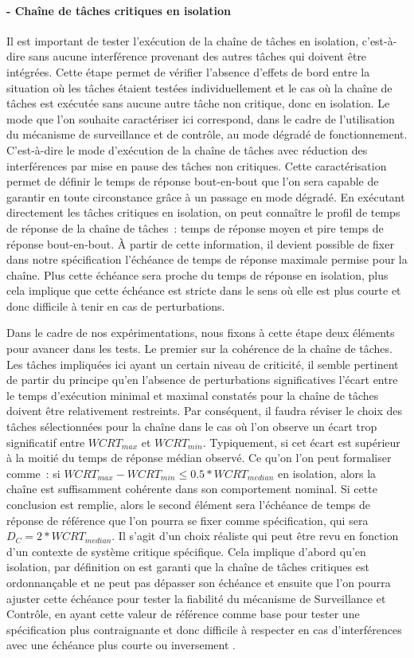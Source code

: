 \documentclass[french, a4paper, 11pt, twoside, pdftex]{StyleThese}
\begin{document}
		\paragraph{ - Chaîne de tâches critiques en isolation}
		Il est important de tester l'exécution de la chaîne de tâches en isolation, c'est-à-dire sans aucune interférence provenant des autres tâches qui doivent être intégrées. Cette étape permet de vérifier l'absence d'effets de bord entre la situation où les tâches étaient testées individuellement et le cas où la chaîne de tâches est exécutée sans aucune autre tâche non critique, donc en isolation. Le mode que l'on souhaite caractériser ici correspond, dans le cadre de l'utilisation du mécanisme de surveillance et de contrôle, au mode dégradé de fonctionnement. C'est-à-dire le mode d'exécution de la chaîne de tâches avec réduction des interférences par mise en pause des tâches non critiques. Cette caractérisation permet de définir le temps de réponse bout-en-bout que l'on sera capable de garantir en toute circonstance grâce à un passage en mode dégradé. En exécutant directement les tâches critiques en isolation, on peut connaître le profil de temps de réponse de la chaîne de tâches~: temps de réponse moyen et pire temps de réponse bout-en-bout. À partir de cette information, il devient possible de fixer dans notre spécification l'échéance de temps de réponse maximale permise pour la chaîne. Plus cette échéance sera proche du temps de réponse en isolation, plus cela implique que cette échéance est stricte dans le sens où elle est plus courte et donc difficile à tenir en cas de perturbations.
			
		Dans le cadre de nos expérimentations, nous fixons à cette étape deux éléments pour avancer dans les tests. Le premier sur la cohérence de la chaîne de tâches. Les tâches impliquées ici ayant un certain niveau de criticité, il semble pertinent de partir du principe qu'en l'absence de perturbations significatives l'écart entre le temps d'exécution minimal et maximal constatés pour la chaîne de tâches doivent être relativement restreints. Par conséquent, il faudra réviser le choix des tâches sélectionnées pour la chaîne dans le cas où l'on observe un écart trop significatif entre $ WCRT_{max} $ et $ WCRT_{min} $. Typiquement, si cet écart est supérieur à la moitié du temps de réponse médian observé. Ce qu'on l'on peut formaliser comme~: si $ WCRT_{max} - WCRT_{min} \leq 0.5*WCRT_{median} $ en isolation, alors la chaîne est suffisamment cohérente dans son comportement nominal. 
		Si cette conclusion est remplie, alors le second élément sera l'échéance de temps de réponse de référence que l'on pourra se fixer comme spécification, qui sera $D_C = 2*WCRT_{median}$. Il s'agit d'un choix réaliste qui peut être revu en fonction d'un contexte de système critique spécifique. Cela implique d'abord qu'en isolation, par définition on est garanti que la chaîne de tâches critiques est ordonnançable et ne peut pas dépasser son échéance et ensuite que l'on pourra ajuster cette échéance pour tester la fiabilité du mécanisme de Surveillance et Contrôle, en ayant cette valeur de référence comme base pour tester une spécification plus contraignante et donc difficile à respecter en cas d'interférences avec une échéance plus courte ou inversement .
\end{document}
